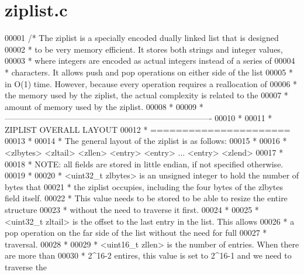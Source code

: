 \hypertarget{ziplist_8c_source}{}\section{ziplist.\+c}
\label{ziplist_8c_source}

\begin{DoxyCode}
00001 \textcolor{comment}{/* The ziplist is a specially encoded dually linked list that is designed}
00002 \textcolor{comment}{ * to be very memory efficient. It stores both strings and integer values,}
00003 \textcolor{comment}{ * where integers are encoded as actual integers instead of a series of}
00004 \textcolor{comment}{ * characters. It allows push and pop operations on either side of the list}
00005 \textcolor{comment}{ * in O(1) time. However, because every operation requires a reallocation of}
00006 \textcolor{comment}{ * the memory used by the ziplist, the actual complexity is related to the}
00007 \textcolor{comment}{ * amount of memory used by the ziplist.}
00008 \textcolor{comment}{ *}
00009 \textcolor{comment}{ * ----------------------------------------------------------------------------}
00010 \textcolor{comment}{ *}
00011 \textcolor{comment}{ * ZIPLIST OVERALL LAYOUT}
00012 \textcolor{comment}{ * ======================}
00013 \textcolor{comment}{ *}
00014 \textcolor{comment}{ * The general layout of the ziplist is as follows:}
00015 \textcolor{comment}{ *}
00016 \textcolor{comment}{ * <zlbytes> <zltail> <zllen> <entry> <entry> ... <entry> <zlend>}
00017 \textcolor{comment}{ *}
00018 \textcolor{comment}{ * NOTE: all fields are stored in little endian, if not specified otherwise.}
00019 \textcolor{comment}{ *}
00020 \textcolor{comment}{ * <uint32\_t zlbytes> is an unsigned integer to hold the number of bytes that}
00021 \textcolor{comment}{ * the ziplist occupies, including the four bytes of the zlbytes field itself.}
00022 \textcolor{comment}{ * This value needs to be stored to be able to resize the entire structure}
00023 \textcolor{comment}{ * without the need to traverse it first.}
00024 \textcolor{comment}{ *}
00025 \textcolor{comment}{ * <uint32\_t zltail> is the offset to the last entry in the list. This allows}
00026 \textcolor{comment}{ * a pop operation on the far side of the list without the need for full}
00027 \textcolor{comment}{ * traversal.}
00028 \textcolor{comment}{ *}
00029 \textcolor{comment}{ * <uint16\_t zllen> is the number of entries. When there are more than}
00030 \textcolor{comment}{ * 2^16-2 entires, this value is set to 2^16-1 and we need to traverse the}

\end{DoxyCode}
